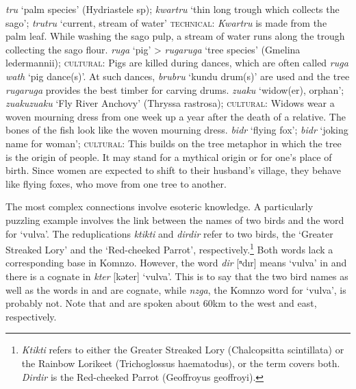 \begin{exe}
\ex
\label{ex639}
\begin{xlist}
	\ex \label{ex640} \emph{tru} `palm species' (Hydriastele sp); \emph{kwartru} `thin long trough which collects the sago'; \emph{trutru} `current, stream of water' \textsc{technical:} \emph{Kwartru} is made from the palm leaf. While washing the sago pulp, a stream of water runs along the trough collecting the sago flour.
	\ex \label{ex641} \emph{ruga} `pig' > \emph{rugaruga} `tree species' (Gmelina ledermannii); \textsc{cultural:} Pigs are killed during dances, which are often called \emph{ruga wath} `pig dance(s)'. At such dances, \emph{brubru} `kundu drum(s)' are used and the tree \emph{rugaruga} provides the best timber for carving drums.
	\sloppy
	\ex \label{ex642} \emph{zuaku} `widow(er), orphan'; \emph{zuakuzuaku} `Fly River Anchovy' (Thryssa rastrosa); \textsc{cultural:} Widows wear a woven mourning dress from one week up a year after the death of a relative. The bones of the fish look like the woven mourning dress.
	\fussy 
	\ex \label{ex643} \emph{bidr} `flying fox'; \emph{bidr} `joking name for woman'; \textsc{cultural:} This builds on the tree metaphor in which the tree is the origin of people. It may stand for a mythical origin or for one's place of birth. Since women are expected to shift to their husband's village, they behave like flying foxes, who move from one tree to another.
\end{xlist}
\end{exe}%

The most complex connections involve esoteric knowledge. A particularly puzzling example involves the link between the names of two birds and the word for `vulva'. The reduplications \emph{ktikti} and \emph{dirdir} refer to two birds, the  `Greater Streaked Lory' and the `Red-cheeked Parrot', respectively.\footnote{\emph{Ktikti} refers to either the Greater Streaked Lory (Chalcopsitta scintillata) or the Rainbow Lorikeet (Trichoglossus haematodus), or the term covers both. \emph{Dirdir} is the Red-cheeked Parrot (Geoffroyus geoffroyi).} Both words lack a corresponding base in Komnzo. However, the word \emph{dir} [{ⁿ}dır] means `vulva' in  and there is a cognate in  \emph{kter} [kəter] `vulva'. This is to say that the two bird names as well as the words in  and  are cognate, while \emph{nzga}, the Komnzo word for `vulva', is probably not. Note that  and  are spoken about 60km to the west and east, respectively.

